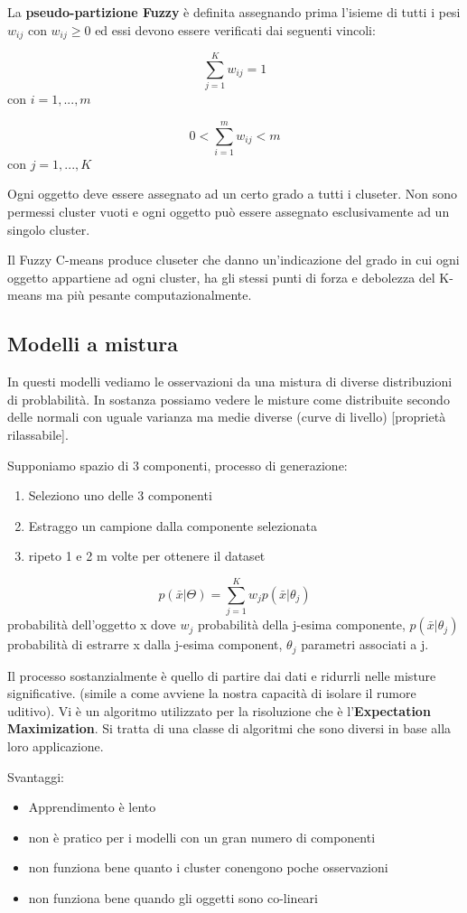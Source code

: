 La \textbf{pseudo-partizione Fuzzy} \`e definita assegnando prima l'isieme di tutti i pesi $w_{ij}$ con $w_{ij} \geq 0$ ed essi devono essere verificati dai seguenti vincoli:

\[\sum_{j=1}^{K} w_{ij} = 1\] con $i = 1, ..., m$

\[ 0 < \sum_{i=1}^{m}w_{ij} < m\] con $j = 1, ..., K$

Ogni oggetto deve essere assegnato ad un certo grado a tutti i cluseter. Non sono permessi cluster vuoti e ogni oggetto pu\`o essere assegnato esclusivamente ad un singolo cluster.

Il Fuzzy C-means produce cluseter che danno un'indicazione del grado in cui ogni oggetto appartiene ad ogni cluster, ha gli stessi punti di forza e debolezza del K-means ma pi\`u pesante computazionalmente.

\subsection{Modelli a mistura}
In questi modelli vediamo le osservazioni da una mistura di diverse distribuzioni di problabilit\`a. In sostanza possiamo vedere le misture come distribuite secondo delle normali con uguale varianza ma medie diverse (curve di livello) [propriet\`a rilassabile]. 

Supponiamo spazio di 3 componenti, processo di generazione:
\begin{enumerate}
	\item Seleziono uno delle 3 componenti
	\item Estraggo un campione dalla componente selezionata
	\item ripeto 1 e 2 m volte per ottenere il dataset
\end{enumerate} 

\[ p(\bar{x}|\Theta) = \sum_{j=1}^{K} w_j p(\bar{x}|\theta_j)\] probabilit\`a dell'oggetto x dove $w_j$ probabilit\`a della j-esima componente, $p(\bar{x}|\theta_j)$ probabilit\`a di estrarre x dalla j-esima component, $\theta_j$ parametri associati a j.

Il processo sostanzialmente \`e quello di partire dai dati e ridurrli nelle misture significative. (simile a come avviene la nostra capacit\`a di isolare il rumore uditivo). Vi \`e un algoritmo utilizzato per la risoluzione che \`e l'\textbf{Expectation Maximization}. Si tratta di una classe di algoritmi che sono diversi in base alla loro applicazione. 

Svantaggi:
\begin{itemize}
	\item Apprendimento \`e lento
	\item non \`e pratico per i modelli con un gran numero di componenti
	\item non funziona bene quanto i cluster conengono  poche osservazioni
	\item non funziona bene quando gli oggetti sono co-lineari
\end{itemize}

